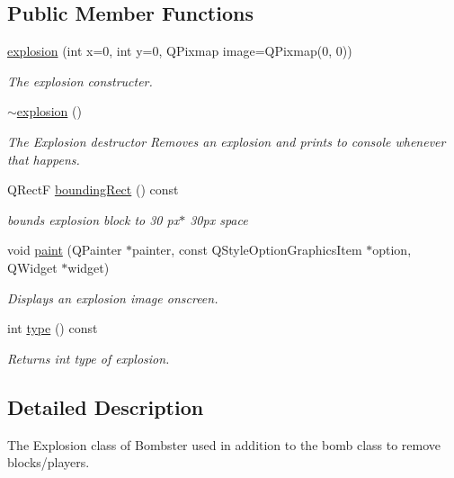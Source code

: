 \subsection*{Public Member Functions}
\begin{DoxyCompactItemize}
\item 
\hyperlink{classexplosion_a792865d6d3230927b5a85c72c9867555}{explosion} (int x=0, int y=0, Q\-Pixmap image=Q\-Pixmap(0, 0))
\begin{DoxyCompactList}\small\item\em The explosion constructer. \end{DoxyCompactList}\item 
\hyperlink{classexplosion_a3fc08d8c702d74ee3164825c975f8230}{$\sim$explosion} ()
\begin{DoxyCompactList}\small\item\em The Explosion destructor Removes an explosion and prints to console whenever that happens. \end{DoxyCompactList}\item 
Q\-Rect\-F \hyperlink{classexplosion_adc8680178e9e7d4e388d8850a2c03125}{bounding\-Rect} () const 
\begin{DoxyCompactList}\small\item\em bounds explosion block to 30 px$\ast$ 30px space \end{DoxyCompactList}\item 
void \hyperlink{classexplosion_a401d7dbebfc4a92bcc408172df67c782}{paint} (Q\-Painter $\ast$painter, const Q\-Style\-Option\-Graphics\-Item $\ast$option, Q\-Widget $\ast$widget)
\begin{DoxyCompactList}\small\item\em Displays an explosion image onscreen. \end{DoxyCompactList}\item 
int \hyperlink{classexplosion_a1f660a5ee0c892cdd4edba1d00df87a7}{type} () const 
\begin{DoxyCompactList}\small\item\em Returns int type of explosion. \end{DoxyCompactList}\end{DoxyCompactItemize}


\subsection{Detailed Description}
The Explosion class of Bombster used in addition to the bomb class to remove blocks/players. 

